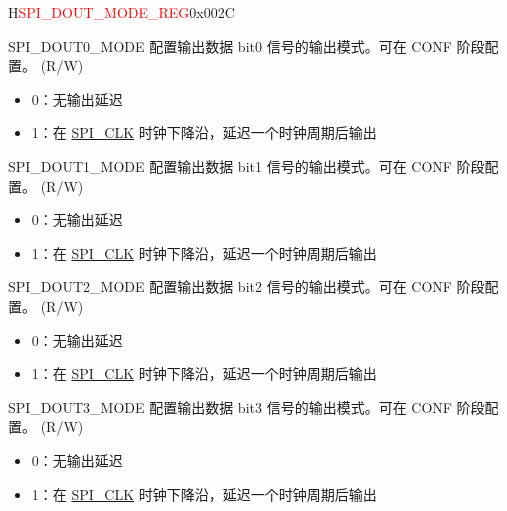 \begin{register}{H}{\textcolor{red}{SPI\_DOUT\_MODE\_REG}}{0x{}002C}\label{regdesc:SPIDOUTMODEREG}
%
%
%
%
%
%
%
%
%
%
\regnewline%
\begin{regdesc}\begin{reglist}
\label{fielddesc:SPIDOUT0MODE}\item [SPI\_DOUT0\_MODE] 配置输出数据 bit0 信号的输出模式。可在 CONF 阶段配置。 (R/W)
\begin{itemize}
    \item 0：无输出延迟
    \item 1：在 \hyperref[clk:SPICLK]{SPI\_CLK} 时钟下降沿，延迟一个时钟周期后输出
\end{itemize}
\label{fielddesc:SPIDOUT1MODE}\item [SPI\_DOUT1\_MODE] 配置输出数据 bit1 信号的输出模式。可在 CONF 阶段配置。 (R/W)
\begin{itemize}
    \item 0：无输出延迟
    \item 1：在 \hyperref[clk:SPICLK]{SPI\_CLK} 时钟下降沿，延迟一个时钟周期后输出
\end{itemize}
\label{fielddesc:SPIDOUT2MODE}\item [SPI\_DOUT2\_MODE] 配置输出数据 bit2 信号的输出模式。可在 CONF 阶段配置。 (R/W)
\begin{itemize}
    \item 0：无输出延迟
    \item 1：在 \hyperref[clk:SPICLK]{SPI\_CLK} 时钟下降沿，延迟一个时钟周期后输出
\end{itemize}
\label{fielddesc:SPIDOUT3MODE}\item [SPI\_DOUT3\_MODE] 配置输出数据 bit3 信号的输出模式。可在 CONF 阶段配置。 (R/W)
\begin{itemize}
    \item 0：无输出延迟
    \item 1：在 \hyperref[clk:SPICLK]{SPI\_CLK} 时钟下降沿，延迟一个时钟周期后输出
\end{itemize}

\end{reglist}
\end{regdesc}
\end{register}

